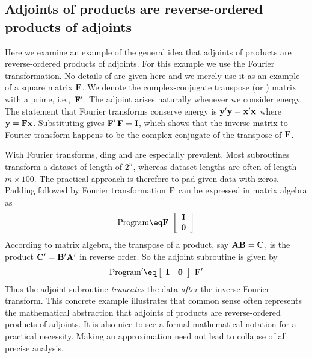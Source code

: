 \subsection{Adjoints of products are reverse-ordered products of adjoints}
Here we examine an example of the general idea that
adjoints of products are reverse-ordered products of adjoints.
For this example we use the Fourier transformation.
No details of  are given here
and we merely use it as an example of a square matrix $\bold F$.
We denote the complex-conjugate transpose (or ) matrix
with a prime,
i.e.,~$\bold F'$.
The adjoint arises naturally whenever we consider energy.
The statement that Fourier transforms conserve energy is 
$\bold y'\bold y=\bold x'\bold x$ where $\bold y= \bold F \bold x$.
Substituting gives $\bold F'\, \bold F = \bold I$, which shows that
the inverse matrix to Fourier transform
happens to be the complex conjugate of the transpose of $\bold F$.
\par
With Fourier transforms,
ding and  are especially prevalent.
Most subroutines transform a dataset of length of $2^n$,
whereas dataset lengths are often of length $m \times 100$.
The practical approach is therefore to pad given data with zeros.
Padding followed by Fourier transformation $\bold F$
can be expressed in matrix algebra as
\begin{equation}
{\rm Program} \eq
\bold F \ 
 \left[ 
  \begin{array}{c}
   \bold I \\ 
   \bold 0
  \end{array}
 \right] 
\end{equation}
According to matrix algebra, the transpose of a product,
say $\bold A \bold B = \bold C$,
is the product $\bold C' = \bold B' \bold A'$ in reverse order.
So the adjoint subroutine is given by
\begin{equation}
{\rm Program'} \eq
 \left[ 
  \begin{array}{cc}
   \bold I & \bold 0
  \end{array}
 \right] 
\
\bold F'
\end{equation}
Thus the adjoint subroutine
{\it truncates} the data {\it after} the inverse Fourier transform.
This concrete example illustrates that common sense often represents
the mathematical abstraction
that adjoints of products are reverse-ordered products of adjoints.
It is also nice to see a formal mathematical notation
for a practical necessity.
Making an approximation need not lead to collapse of all precise analysis.


